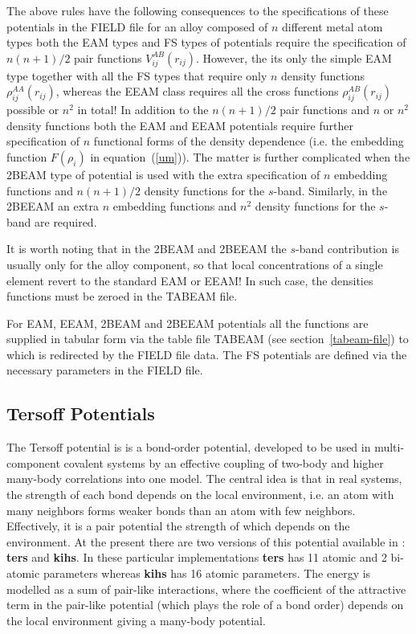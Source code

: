The above rules have the following consequences to the
specifications of these potentials in the \D FIELD file for an
alloy composed of $n$ different metal atom types both the EAM types
and FS types of potentials require the specification of $n(n+1)/2$
pair functions $V^{AB}_{ij}(r_{ij})$.  However, the its only the simple
EAM type together with all the FS types that require only $n$ density
functions $\rho^{AA}_{ij}(r_{ij})$, whereas the EEAM class requires all
the cross functions $\rho^{AB}_{ij}(r_{ij})$ possible or $n^{2}$ in total!
In addition to the $n(n+1)/2$ pair functions and $n$ or $n^{2}$ density
functions both the EAM and EEAM potentials require further specification
of $n$ functional forms of the density dependence (i.e. the embedding
function $F(\rho_{i})$ in equation~(\ref{um})).  The matter is further complicated
when the 2BEAM type of potential is used with the extra specification of
$n$ embedding functions and $n(n+1)/2$ density functions for the $s$-band.
Similarly, in the 2BEEAM an extra $n$ embedding functions and $n^{2}$
density functions for the $s$-band are required.

It is worth noting that in the 2BEAM and 2BEEAM the $s$-band contribution
is usually only for the alloy component, so that local concentrations of
a single element revert to the standard EAM or EEAM!  In such case, the
densities functions must be zeroed in the \D TABEAM file.

For EAM, EEAM, 2BEAM and 2BEEAM potentials all the functions are supplied
in tabular form via the table file TABEAM (see section~\ref{tabeam-file})
to which \D is redirected by the FIELD file data.  The FS potentials are
defined via the necessary parameters in the FIELD file.

\subsection{Tersoff Potentials}
\label{tersoff}

The Tersoff \cite{tersoff-89a} potential is
is a bond-order potential, developed to be used in multi-component
covalent systems by an effective coupling of two-body and higher
many-body correlations into one model.  The central idea is that in
real systems, the strength of each bond depends on the local
environment, i.e. an atom with many neighbors forms weaker bonds
than an atom with few neighbors.  Effectively, it is a pair potential
the strength of which depends on the environment.  At the present there
are two versions of this potential available in \D: {\bf ters} and
{\bf kihs}.  In these particular implementations {\bf ters} has 11
atomic and 2 bi-atomic parameters whereas {\bf kihs} \cite{kumagai-07a}
has 16 atomic parameters.  The energy is modelled as a sum of pair-like
interactions, where the coefficient of the attractive term in the
pair-like potential (which plays the role of a bond order) depends on
the local environment giving a many-body potential.

